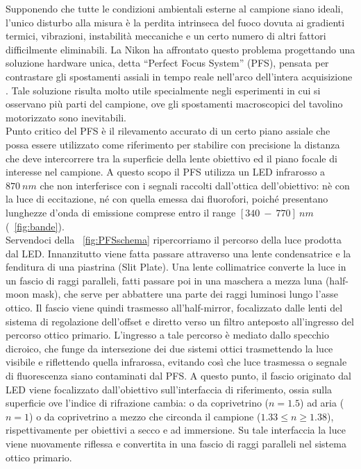 \begin{itemize}
Supponendo che tutte le condizioni ambientali esterne al campione siano ideali, l'unico disturbo alla misura è la perdita intrinseca del fuoco dovuta ai gradienti termici, vibrazioni, instabilità meccaniche e un certo numero di altri fattori difficilmente eliminabili.
La Nikon ha affrontato questo problema progettando una soluzione hardware unica, detta ``Perfect Focus System'' (PFS), pensata per contrastare gli spostamenti assiali in tempo reale nell'arco dell'intera acquisizione \cite{Nikon2}. 
Tale soluzione risulta molto utile specialmente negli esperimenti in cui si osservano più parti del campione, ove gli spostamenti macroscopici del tavolino motorizzato sono inevitabili.
\\ Punto critico del PFS è il rilevamento accurato di un certo piano assiale che possa essere utilizzato come riferimento per stabilire con precisione la distanza che deve intercorrere tra la superficie della lente obiettivo ed il piano focale di interesse nel campione. 
A questo scopo il PFS utilizza un LED infrarosso a $870\ nm$ che non interferisce con i segnali raccolti dall'ottica dell'obiettivo: nè con la luce di eccitazione, né con quella emessa dai fluorofori, poiché presentano lunghezze d'onda di emissione comprese entro il range $[340\ -\ 770]\ nm$ (\figurename~\ref{fig:bande}).
\\ Servendoci della \figurename~\ref{fig:PFSschema} ripercorriamo il percorso della luce prodotta dal LED. 
Innanzitutto viene fatta passare attraverso una lente condensatrice e la fenditura di una piastrina (Slit Plate).
Una lente collimatrice converte la luce in un fascio di raggi paralleli, fatti passare poi in una maschera a mezza luna (half-moon mask), che serve per abbattere una parte dei raggi luminosi lungo l'asse ottico.
Il fascio viene quindi trasmesso all'half-mirror, focalizzato dalle lenti del sistema di regolazione dell'offset e diretto verso un filtro anteposto all'ingresso del percorso ottico primario. 
L'ingresso a tale percorso è mediato dallo specchio dicroico, che funge da intersezione dei due sistemi ottici trasmettendo la luce visibile e riflettendo quella infrarossa, evitando così che luce trasmessa o segnale di fluorescenza siano contaminati dal PFS. 
A questo punto, il fascio originato dal LED viene focalizzato dall'obiettivo sull'interfaccia di riferimento, ossia sulla superficie ove l'indice di rifrazione cambia: o da coprivetrino ($n=1.5$) ad aria ($n=1$) o da coprivetrino a mezzo che circonda il campione ($1.33\leq n \geq 1.38$), rispettivamente per obiettivi a secco e ad immersione. 
Su tale interfaccia la luce viene nuovamente riflessa e convertita in una fascio di raggi paralleli nel sistema ottico primario. 

\end{itemize}
